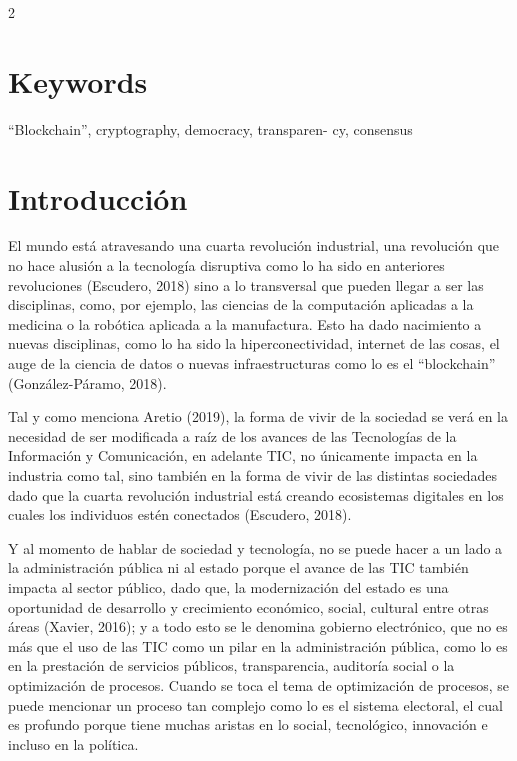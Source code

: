 \documentclass[12pt,spanish,Letterpaper,openany]{book}
\begin{document}
\begin {multicols}{2}
\hypertarget{keywords}{%
\section{Keywords}\label{keywords}}

``Blockchain'', cryptography, democracy, transparen-
cy, consensus

\hypertarget{introducciuxf3n-2}{%
\section{Introducción}\label{introducciuxf3n-2}}

El mundo está atravesando una cuarta revolución industrial, una revolución que no hace alusión a la tecnología disruptiva como lo ha sido en anteriores revoluciones (Escudero, 2018) sino a lo transversal que pueden llegar a ser las disciplinas, como, por ejemplo, las ciencias de la computación aplicadas a la medicina o la robótica aplicada a la manufactura. Esto ha dado nacimiento a nuevas disciplinas, como lo ha sido la hiperconectividad, internet de las cosas, el auge de la ciencia de datos o nuevas infraestructuras como lo es el ``blockchain'' (González-Páramo, 2018).

Tal y como menciona Aretio (2019), la forma de vivir de la sociedad se verá en la necesidad de ser modificada a raíz de los avances de las Tecnologías de la Información y Comunicación, en adelante TIC, no únicamente impacta en la industria como tal, sino también en la forma de vivir de las distintas sociedades dado que la cuarta revolución industrial está creando ecosistemas digitales en los cuales los individuos estén conectados (Escudero, 2018).

Y al momento de hablar de sociedad y tecnología, no se puede hacer a un lado a la administración pública ni al estado porque el avance de las TIC también impacta al sector público, dado que, la modernización del estado es una oportunidad de desarrollo y crecimiento económico, social, cultural entre otras áreas (Xavier, 2016); y a todo esto se le denomina gobierno electrónico, que no es más que el uso de las TIC como un pilar en la administración pública, como lo es en la prestación de servicios públicos, transparencia, auditoría social o la optimización de procesos. Cuando se toca el tema de optimización de procesos, se puede mencionar un proceso tan complejo como lo es el sistema electoral, el cual es profundo porque tiene muchas aristas en lo social, tecnológico, innovación e incluso en la política.


\end{multicols}
\end{document}
